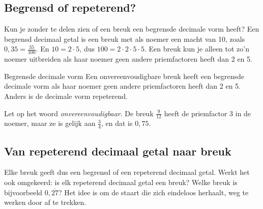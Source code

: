 \begin{oefeningen}
\end{oefeningen}

\subsection{Begrensd of repeterend?}

Kun je zonder te delen zien of een breuk een begrensde decimale vorm heeft? Een begrensd decimaal getal is een breuk met als noemer een macht van 10, zoals $0,35 = \tfrac{35}{100}$. En $10 = 2 \cdot 5$, dus $100 = 2 \cdot 2 \cdot 5 \cdot 5$. Een breuk kun je alleen tot zo'n noemer uitbreiden als haar noemer geen andere priemfactoren heeft dan 2 en 5.

\begin{theorie}
\begin{stelling}{Begrensde decimale vorm}
Een onvereenvoudigbare breuk heeft een begrensde decimale vorm als haar noemer geen andere priemfactoren heeft dan 2 en 5. Anders is de decimale vorm repeterend.
\end{stelling}
\end{theorie}

Let op het woord \textit{onvereenvoudigbaar}. De breuk $\tfrac{9}{12}$ heeft de priemfactor 3 in de noemer, maar ze is gelijk aan $\tfrac34$, en dat is $0,75$.


\begin{oefeningen}
\end{oefeningen}

\subsection{Van repeterend decimaal getal naar breuk}

Elke breuk geeft dus een begrensd of een repeterend decimaal getal. Werkt het ook omgekeerd: is elk repeterend decimaal getal een breuk? Welke breuk is bijvoorbeeld $0,\overline{27}$? Het idee is om de staart die zich eindeloos herhaalt, weg te werken door af te trekken.

